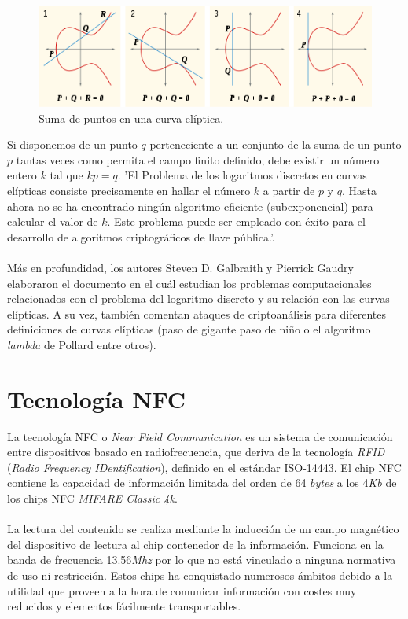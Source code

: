 \documentclass[../PFC.tex]{subfiles}
\begin{document}
\begin{figure}[H]
  \centering
  \includegraphics[width=1\textwidth]{./img/ECC}
  \caption{Suma de puntos en una curva elíptica.}
  \label{img:ecc}
\end{figure}

Si disponemos de un punto $q$ perteneciente a un conjunto de la suma de un punto $p$ tantas veces como permita el campo finito definido, debe existir un número entero $k$ tal que $kp = q$. 'El Problema de los logaritmos discretos en curvas elípticas consiste precisamente en hallar el número $k$ a partir de $p$ y $q$. Hasta ahora no se ha encontrado ningún algoritmo eficiente (subexponencial) para calcular el valor de $k$. Este problema puede ser empleado con éxito para el desarrollo de algoritmos criptográficos de llave pública.'\cite{lucena}.
\\\\
Más en profundidad, los autores Steven D. Galbraith y Pierrick Gaudry elaboraron el documento \cite{galbraith2016recent} en el cuál estudian los problemas computacionales relacionados con el problema del logaritmo discreto y su relación con las curvas elípticas. A su vez, también comentan ataques de criptoanálisis para diferentes definiciones de curvas elípticas (paso de gigante paso de niño o el algoritmo \textit{lambda} de Pollard entre otros).

\section{Tecnología NFC}
\label{Tecnología NFC}

La tecnología NFC o \textit{Near Field Communication} es un sistema de comunicación entre dispositivos basado en radiofrecuencia, que deriva de la tecnología \textit{RFID} (\textit{Radio Frequency IDentification}), definido en el estándar ISO-14443\cite{iso14443}. El chip NFC contiene la capacidad de información limitada del orden de 64 \textit{bytes} a los 4\textit{Kb} de los chips NFC \textit{MIFARE Classic 4k}.
\\\\
La lectura del contenido se realiza mediante la inducción de un campo magnético del dispositivo de lectura al chip contenedor de la información. Funciona en la banda de frecuencia 13.56\textit{Mhz} por lo que no está vinculado a ninguna normativa de uso ni restricción. Estos chips ha conquistado numerosos ámbitos debido a la utilidad que proveen a la hora de comunicar información con costes muy reducidos y elementos fácilmente transportables.
\end{document}
